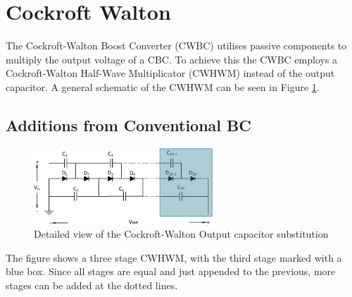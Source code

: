 \section{Cockroft Walton}\label{ch:cock}
The Cockroft-Walton Boost Converter (CWBC) utilises passive components to multiply the output voltage of a CBC.
To achieve this the CWBC employs a Cockroft-Walton Half-Wave Multiplicator (CWHWM) instead of the output capacitor.
A general schematic of the CWHWM can be seen in Figure \ref{fig:CWHWM}.

\subsection{Additions from Conventional BC}
\begin{figure}[H]
   \centering
   \includegraphics[width=0.6\textwidth]{figures/xCockroftWalton/CockroftWalton.pdf}
    \caption{Detailed view of the Cockroft-Walton Output capacitor substitution}
	\label{fig:CWHWM}
\end{figure}

The figure shows a three stage CWHWM,
with the third stage marked with a blue box.
Since all stages are equal and just appended to the previous,
more stages can be added at the dotted lines.

